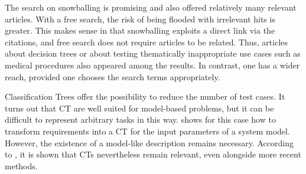 The search on snowballing is promising and also offered relatively many relevant articles. With a free search, the risk of being flooded with irrelevant hits is greater. This makes sense in that snowballing exploits a direct link via the citations, and free search does not require articles to be related. Thus, articles about decision trees or about testing thematically inappropriate use cases such as medical procedures also appeared among the results. In contrast, one has a wider reach, provided one chooses the search terms appropriately.

Classification Trees offer the possibility to reduce the number of test cases. It turns out that CT are well suited for model-based problems, but it can be difficult to represent arbitrary tasks in this way.  \cite{Conrad} shows for this case how to transform requirements into a CT for the input parameters of a system model. However, the existence of a model-like description remains necessary. According to \cite{Belli}, it is shown that CTs nevertheless remain relevant, even alongside more recent methods.








